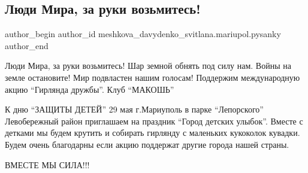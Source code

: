  
 
 
 
 

\subsection{Люди Мира, за руки возьмитесь!}
\label{sec:25_05_2016.fb.meshkova_davydenko_svitlana.mariupol.pysanky.1.ludi_mira_za_ruki_vozmites}

\ifcmt
 author_begin
   author_id meshkova_davydenko_svitlana.mariupol.pysanky
 author_end
\fi

Люди Мира, за руки возьмитесь! Шар земной обнять под силу нам. Войны на земле
остановите! Мир подвластен нашим голосам! Поддержим международную акцию
\enquote{Гирлянда дружбы}. Клуб \enquote{МАКОШЬ} 

К дню \enquote{ЗАЩИТЫ ДЕТЕЙ} 29 мая г.Мариуполь  в парке \enquote{Лепорского}
Левобережный район приглашаем на праздник \enquote{Город детских улыбок}.
Вместе с детками мы будем крутить и собирать гирлянду с маленьких кукоколок
кувадки. Будем очень благодарны если акцию поддержат другие города нашей
страны.

ВМЕСТЕ МЫ СИЛА!!!
